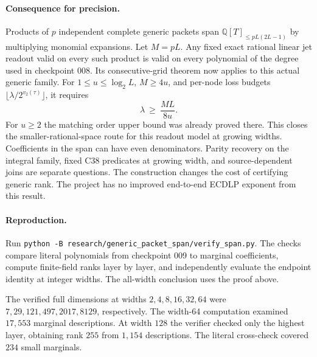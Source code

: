 \documentclass[11pt]{article}
\newcommand{\QQ}{\mathbb Q}
\begin{document}
\paragraph{Consequence for precision.}
Products of $p$ independent complete generic packets span
$\QQ[T]_{\le pL(2L-1)}$ by multiplying monomial expansions. Let $M=pL$.
Any fixed exact rational linear jet readout valid on every such product
is valid on every polynomial of the degree used in checkpoint 008.
Its consecutive-grid theorem now applies to this actual generic family.
For $1\le u\le\log_2L$, $M\ge4u$, and per-node loss budgets
$\lfloor\lambda/2^{v_2(\tau)}\rfloor$, it requires
\[
 \lambda\ \ge\ \frac{ML}{8u}.
\]
For $u\ge2$ the matching order upper bound was already proved there.
This closes the smaller-rational-space route for this readout model
at growing widths. Coefficients in the span can have even denominators.
Parity recovery on the integral family, fixed C38 predicates at growing
width, and source-dependent joins are separate questions. The construction
changes the cost of certifying generic rank. The project has no improved
end-to-end ECDLP exponent from this result.

\paragraph{Reproduction.}
Run \texttt{python -B research/generic\_packet\_span/verify\_span.py}.
The checks compare literal polynomials from checkpoint 009 to marginal
coefficients, compute finite-field ranks layer by layer, and independently
evaluate the endpoint identity at integer widths. The all-width conclusion
uses the proof above.

The verified full dimensions at widths $2,4,8,16,32,64$ were
$7,29,121,497,2017,8129$, respectively. The width-64 computation
examined $17{,}553$ marginal descriptions. At width $128$ the verifier
checked only the highest layer, obtaining rank $255$ from $1{,}154$
descriptions. The literal cross-check covered $234$ small marginals.
\end{document}
